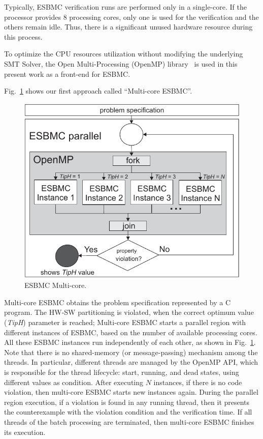 Typically, ESBMC verification runs are performed only in a single-core. If the processor provides $8$ processing cores, only one is used for the verification and the others remain idle. Thus, there is a significant unused hardware resource during this process. 


To optimize the CPU resources utilization without modifying the underlying SMT Solver, the Open Multi-Processing (OpenMP) library~\cite{Dagum1998} is used in this present work as a front-end for ESBMC.

Fig.~\ref{ESBMC-Multi-core} shows our first approach called ``Multi-core ESBMC''.
%
\begin{figure}[ht]
	\centering
  \includegraphics[scale=0.75]{Image/esbmc-parallel.pdf} 
	\caption{ESBMC Multi-core.}
	\label{ESBMC-Multi-core}
\end{figure}

Multi-core ESBMC obtains the problem specification represented by a C program. The HW-SW partitioning is violated, when the correct optimum value (\textit{TipH}) parameter is reached; Multi-core ESBMC starts a parallel region with different instances of ESBMC, based on the number of available processing cores. All these ESBMC instances run independently of each other, as shown in Fig.~\ref{ESBMC-Multi-core}. Note that there is no shared-memory (or message-passing) mechanism among the threads. In particular, different threads are managed by the OpenMP API, which is responsible for the thread lifecycle: start, running, and dead states, using different values as condition. After executing $N$ instances, if there is no code violation, then multi-core ESBMC starts new instances again. During the parallel region execution, if a violation is found in any running thread, then it presents the counterexample with the violation condition and the verification time. If all threads of the batch processing are terminated, then multi-core ESBMC finishes its execution.

